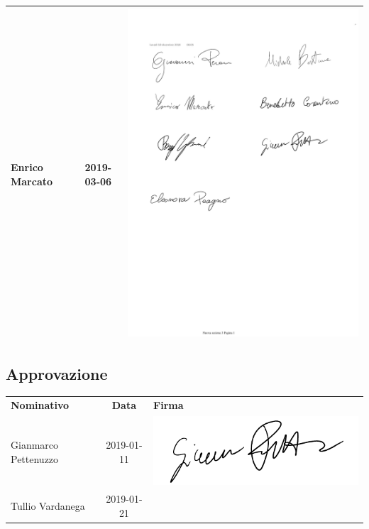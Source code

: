 {\begin{table}[H]
\begin{tabular}{| l | c | >{\centering\arraybackslash}m{8cm}
			|}
	Enrico Marcato & 2019-03-06 & \includegraphics[scale=0.65]{images/firme/enrico.pdf}\\ \hline
\end{tabular}
\end{table}
}
\subsection{Approvazione}
{\renewcommand{\arraystretch}{1.4}%
\begin{table}[H]
	\centering
	\begin{tabular}{| l | c | >{\centering\arraybackslash}m{8cm}
			|} 
	\rowcolor{LightBlue}
	\textbf{\color{white}Nominativo} & 
	\textbf{\color{white}Data} & 
	\textbf{\color{white}Firma} \\
	
	Gianmarco Pettenuzzo & 2019-01-11 & \includegraphics[scale=0.5]{images/firme/giammi.pdf}\\[1cm]
	Tullio Vardanega & 2019-01-21 & \\[0.5cm] \hline
\end{tabular}
\end{table}
}
\newpage
